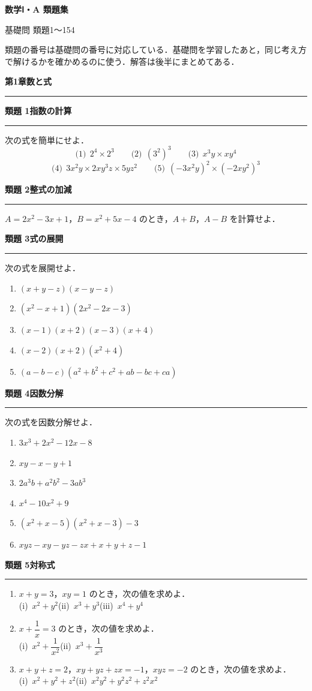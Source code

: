 \documentclass[a4paper,11pt]{ltjsarticle}
\newcommand{\mon}[2]{\Needspace{7\baselineskip}\vspace{10pt}%
  {\sffamily\bfseries 類題 #1\quad #2\par}\vspace{2pt}\hrule\vspace{4pt}}
\newcommand{\shou}[2]{\clearpage\markboth{#1\quad #2}{}%
  {\sffamily\bfseries\LARGE #1\quad #2\par}\vspace{2pt}\hrule height 1.2pt\vspace{4pt}}
\begin{document}
\thispagestyle{empty}
\begin{center}
\vspace*{50mm}
{\sffamily\bfseries\Huge 数学Ⅰ・A 類題集\par}
\vspace{8mm}
{\sffamily\Large 基礎問 類題1〜154\par}
\vspace{15mm}
\begin{minipage}{0.75\linewidth}\small
類題の番号は基礎問の番号に対応している．基礎問を学習したあと，同じ考え方で解けるかを確かめるのに使う．解答は後半にまとめてある．
\end{minipage}
\end{center}
\clearpage
\setcounter{page}{1}
\shou{第1章}{数と式}
\mon{1}{指数の計算}
次の式を簡単にせよ．
\[\text{(1)}\ \ 2^4\times2^3\qquad \text{(2)}\ \ (3^2)^3\qquad \text{(3)}\ \ x^3y\times xy^4\]
\[\text{(4)}\ \ 3x^2y\times2xy^3z\times5yz^2\qquad \text{(5)}\ \ (-3x^2y)^2\times(-2xy^2)^3\]

\mon{2}{整式の加減}
$A=2x^2-3x+1$，$B=x^2+5x-4$ のとき，$A+B$，$A-B$ を計算せよ．

\mon{3}{式の展開}
次の式を展開せよ．
\begin{enumerate}
\item $(x+y-z)(x-y-z)$
\item $(x^2-x+1)(2x^2-2x-3)$
\item $(x-1)(x+2)(x-3)(x+4)$
\item $(x-2)(x+2)(x^2+4)$
\item $(a-b-c)(a^2+b^2+c^2+ab-bc+ca)$
\end{enumerate}

\mon{4}{因数分解}
次の式を因数分解せよ．
\begin{multicols}{2}
\begin{enumerate}
\item $3x^3+2x^2-12x-8$
\item $xy-x-y+1$
\item $2a^3b+a^2b^2-3ab^3$
\item $x^4-10x^2+9$
\item $(x^2+x-5)(x^2+x-3)-3$
\item $xyz-xy-yz-zx+x+y+z-1$
\end{enumerate}
\end{multicols}

\mon{5}{対称式}
\begin{enumerate}
\item $x+y=3$，$xy=1$ のとき，次の値を求めよ．\\
(i)\ $x^2+y^2$\qquad (ii)\ $x^3+y^3$\qquad (iii)\ $x^4+y^4$
\item $x+\dfrac1x=3$ のとき，次の値を求めよ．\\
(i)\ $x^2+\dfrac1{x^2}$\qquad (ii)\ $x^3+\dfrac1{x^3}$
\item $x+y+z=2$，$xy+yz+zx=-1$，$xyz=-2$ のとき，次の値を求めよ．\\
(i)\ $x^2+y^2+z^2$\qquad (ii)\ $x^2y^2+y^2z^2+z^2x^2$
\end{enumerate}
\end{document}
